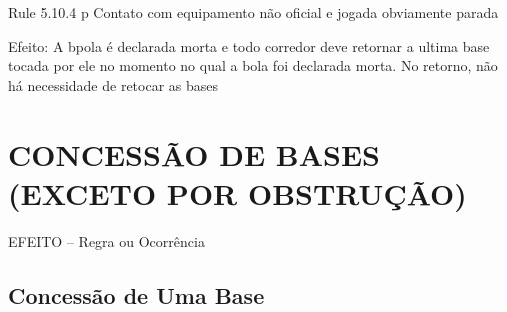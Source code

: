 Rule 5.10.4 p Contato com equipamento não oficial e jogada obviamente parada

 Efeito: A bpola é declarada morta e todo corredor deve retornar a ultima base tocada por ele no momento no qual a bola foi declarada morta. No retorno, não há necessidade de retocar as bases

\section{CONCESSÃO DE BASES (EXCETO POR OBSTRUÇÃO)}

 EFEITO -- Regra ou Ocorrência

\subsection{Concessão de Uma Base}

